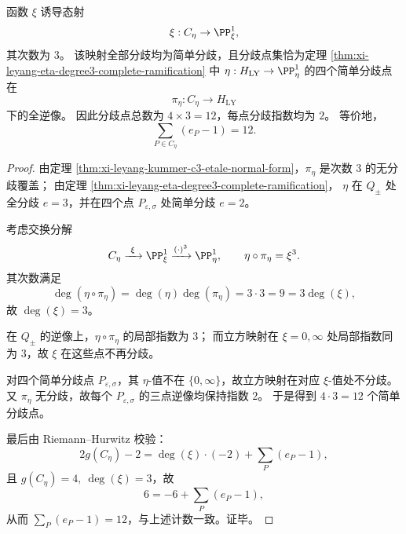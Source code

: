 \begin{conclusion}\label{con:xi-leyang-xi-map-trigonal-complete-branch-spectrum}
函数 \(\xi\) 诱导态射
\[
\xi:C_\eta\to\PP^1_\xi,
\]
其次数为 \(3\)。
该映射全部分歧均为简单分歧，且分歧点集恰为定理
\ref{thm:xi-leyang-eta-degree3-complete-ramification}
中 \(\eta:H_{\mathrm{LY}}\to\PP^1_\eta\) 的四个简单分歧点在
\[
\pi_\eta:C_\eta\to H_{\mathrm{LY}}
\]
下的全逆像。
因此分歧点总数为 \(4\times 3=12\)，每点分歧指数均为 \(2\)。
等价地，
\[
\sum_{P\in C_\eta}(e_P-1)=12.
\]
\end{conclusion}
\begin{proof}
由定理 \ref{thm:xi-leyang-kummer-c3-etale-normal-form}，\(\pi_\eta\) 是次数 \(3\) 的无分歧覆盖；
由定理 \ref{thm:xi-leyang-eta-degree3-complete-ramification}，
\(\eta\) 在 \(Q_\pm\) 处全分歧 \(e=3\)，并在四个点 \(P_{\varepsilon,\sigma}\) 处简单分歧 \(e=2\)。

考虑交换分解
\[
C_\eta \xrightarrow{\ \xi\ } \PP^1_\xi \xrightarrow{(\cdot)^3} \PP^1_\eta,
\qquad
\eta\circ\pi_\eta=\xi^3.
\]
其次数满足
\[
\deg(\eta\circ\pi_\eta)=\deg(\eta)\deg(\pi_\eta)=3\cdot 3=9
=3\deg(\xi),
\]
故 \(\deg(\xi)=3\)。

在 \(Q_\pm\) 的逆像上，\(\eta\circ\pi_\eta\) 的局部指数为 \(3\)；
而立方映射在 \(\xi=0,\infty\) 处局部指数同为 \(3\)，故 \(\xi\) 在这些点不再分歧。

对四个简单分歧点 \(P_{\varepsilon,\sigma}\)，其 \(\eta\)-值不在 \(\{0,\infty\}\)，故立方映射在对应 \(\xi\)-值处不分歧。
又 \(\pi_\eta\) 无分歧，故每个 \(P_{\varepsilon,\sigma}\) 的三点逆像均保持指数 \(2\)。
于是得到 \(4\cdot 3=12\) 个简单分歧点。

最后由 Riemann--Hurwitz 校验：
\[
2g(C_\eta)-2
=\deg(\xi)\cdot(-2)+\sum_P(e_P-1),
\]
且 \(g(C_\eta)=4,\ \deg(\xi)=3\)，故
\[
6=-6+\sum_P(e_P-1),
\]
从而 \(\sum_P(e_P-1)=12\)，与上述计数一致。证毕。
\end{proof}

\endinput
